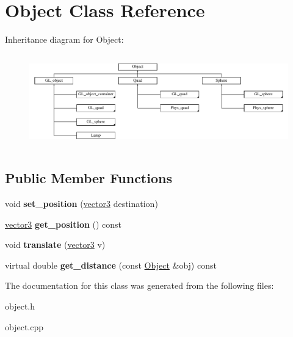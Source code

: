 \hypertarget{class_object}{
\section{Object Class Reference}
\label{class_object}
}
Inheritance diagram for Object:\begin{figure}[H]
\begin{center}
\leavevmode
\includegraphics[height=4.087591cm]{class_object}
\end{center}
\end{figure}
\subsection*{Public Member Functions}
\begin{DoxyCompactItemize}
\item 
\hypertarget{class_object_a1751a104d66e775d2e5b8ea33d4daf9c}{
void {\bfseries set\_\-position} (\hyperlink{classvector3d}{vector3} destination)}
\label{class_object_a1751a104d66e775d2e5b8ea33d4daf9c}

\item 
\hypertarget{class_object_ab38c3c23f3870bc7d32f77de1bb5ea30}{
\hyperlink{classvector3d}{vector3} {\bfseries get\_\-position} () const }
\label{class_object_ab38c3c23f3870bc7d32f77de1bb5ea30}

\item 
\hypertarget{class_object_aac84565cdb932f6432e9f78ae6772f3b}{
void {\bfseries translate} (\hyperlink{classvector3d}{vector3} v)}
\label{class_object_aac84565cdb932f6432e9f78ae6772f3b}

\item 
\hypertarget{class_object_a93dc618fab18eb529688a2b5c30b0b56}{
virtual double {\bfseries get\_\-distance} (const \hyperlink{class_object}{Object} \&obj) const }
\label{class_object_a93dc618fab18eb529688a2b5c30b0b56}

\end{DoxyCompactItemize}


The documentation for this class was generated from the following files:\begin{DoxyCompactItemize}
\item 
object.h\item 
object.cpp\end{DoxyCompactItemize}
